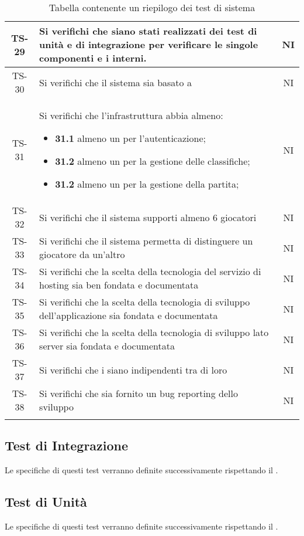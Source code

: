 \begin{center}
\begin{longtable}{|c|p{10cm}|c|}
			 \hline
			 TS-29 & Si verifichi che siano stati realizzati dei test di unità e di integrazione per verificare le singole componenti e i \glock{subsystem} interni. & NI \\
			 \hline
			 TS-30 & Si verifichi che il sistema sia basato a \glock{microservizi} & NI \\
			 \hline
			 TS-31 & Si verifichi che l'infrastruttura abbia almeno: 
			 \begin{itemize}
			 	\item\textbf{31.1} almeno un \glock{microservizio} per l'autenticazione;
			 	\item\textbf{31.2} almeno un \glock{microservizio} per la gestione delle classifiche;
			 	\item\textbf{31.2} almeno un \glock{microservizio} per la gestione della partita;
			 \end{itemize}& NI \\
			 \hline
			 TS-32 & Si verifichi che il sistema supporti almeno 6 giocatori & NI \\
			 \hline
			 TS-33 & Si verifichi che il sistema permetta di distinguere un giocatore da un'altro & NI \\
			 \hline
			 TS-34 & Si verifichi che la scelta della tecnologia del servizio di hosting sia ben fondata e documentata & NI \\
			 \hline
			 TS-35 & Si verifichi che la scelta della tecnologia di sviluppo dell'applicazione sia fondata e documentata & NI \\
			 \hline
			 TS-36 & Si verifichi che la scelta della tecnologia di sviluppo lato server sia fondata e documentata & NI \\
			 \hline
			 TS-37 & Si verifichi che i \glock{microservizi} siano indipendenti tra di loro & NI \\ 
			 \hline
			 TS-38 & Si verifichi che sia fornito un bug reporting dello sviluppo & NI \\ 
			 \hline
			 \rowcolor{white}
			 \caption{Tabella contenente un riepilogo dei test di sistema}
			\end{longtable}
		\end{center}


	\subsection{Test di Integrazione}
		Le specifiche di questi test verranno definite successivamente rispettando il . 

	\subsection{Test di Unità}
	 	Le specifiche di questi test verranno definite successivamente rispettando il . 
